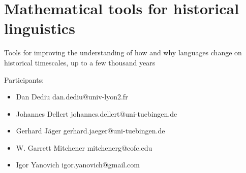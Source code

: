 
\section{Mathematical tools for historical linguistics}

Tools for improving the understanding of how and why languages change on historical timescales, up to a few thousand years

Participants:
\begin{itemize}
\item Dan Dediu dan.dediu@univ-lyon2.fr
\item Johannes Dellert johannes.dellert@uni-tuebingen.de
\item Gerhard Jäger gerhard.jaeger@uni-tuebingen.de
\item W. Garrett Mitchener mitchenerg@cofc.edu
\item Igor Yanovich igor.yanovich@gmail.com
\end{itemize}

